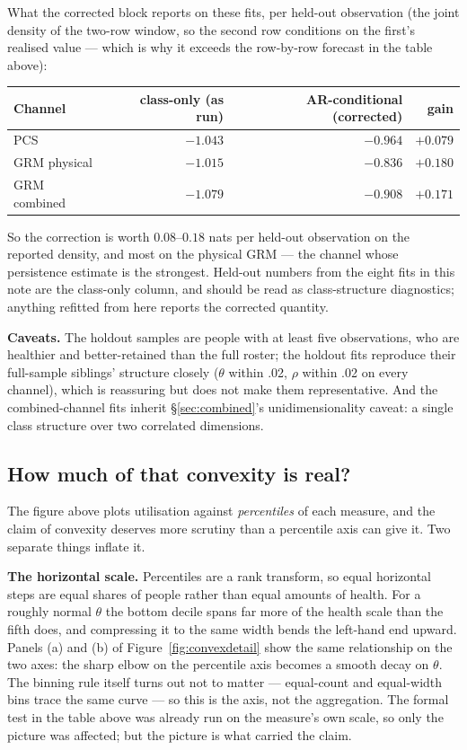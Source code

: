 \documentclass[11pt]{article}
\begin{document}
What the corrected block reports on these fits, per held-out observation
(the joint density of the two-row window, so the second row conditions on
the first's realised value --- which is why it exceeds the row-by-row
forecast in the table above):

\begin{center}\small
\begin{tabular}{lrrr}
\toprule
Channel & class-only (as run) & AR-conditional (corrected) & gain \\
\midrule
PCS & $-1.043$ & $-0.964$ & $+0.079$ \\
GRM physical & $-1.015$ & $-0.836$ & $+0.180$ \\
GRM combined & $-1.079$ & $-0.908$ & $+0.171$ \\
\bottomrule
\end{tabular}
\end{center}

So the correction is worth $0.08$--$0.18$ nats per held-out observation on
the reported density, and most on the physical GRM --- the channel whose
persistence estimate is the strongest. Held-out numbers from the eight fits
in this note are the class-only column, and should be read as
class-structure diagnostics; anything refitted from here reports the
corrected quantity.

\textbf{Caveats.} The holdout samples are people with at least five
observations, who are healthier and better-retained than the full roster;
the holdout fits reproduce their full-sample siblings' structure closely
($\theta$ within .02, $\rho$ within .02 on every channel), which is
reassuring but does not make them representative. And the combined-channel
fits inherit \S\ref{sec:combined}'s unidimensionality caveat: a single class
structure over two correlated dimensions.

\subsection{How much of that convexity is real?}
\label{sec:convexdetail}

The figure above plots utilisation against \emph{percentiles} of each
measure, and the claim of convexity deserves more scrutiny than a percentile
axis can give it. Two separate things inflate it.

\textbf{The horizontal scale.} Percentiles are a rank transform, so equal
horizontal steps are equal shares of people rather than equal amounts of
health. For a roughly normal $\theta$ the bottom decile spans far more of the
health scale than the fifth does, and compressing it to the same width bends
the left-hand end upward. Panels (a) and (b) of
Figure~\ref{fig:convexdetail} show the same relationship on the two axes:
the sharp elbow on the percentile axis becomes a smooth decay on $\theta$.
The binning rule itself turns out not to matter --- equal-count and
equal-width bins trace the same curve --- so this is the axis, not the
aggregation. The formal test in the table above was already run on the
measure's own scale, so only the picture was affected; but the picture is
what carried the claim.
\end{document}
